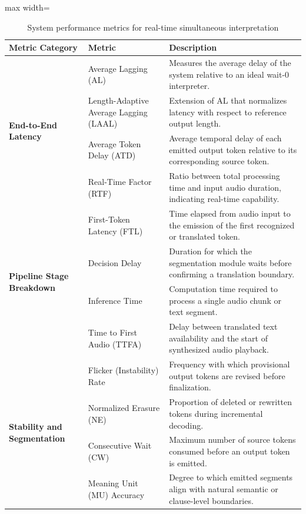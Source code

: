 \begin{table}[!htbp]
  \centering
  \caption[System performance metrics]{System performance metrics for real-time simultaneous interpretation}
  \label{tab:system_metrics}
  \small
  \begin{adjustbox}{max width=\textwidth}
    \begin{tabular}{p{4.5cm} p{4.2cm} p{7.6cm}}
      \toprule
      \textbf{Metric Category} & \textbf{Metric} & \textbf{Description} \\
      \midrule
      \multirow{4}{*}{\textbf{End-to-End Latency}}
        & Average Lagging (AL) 
        & Measures the average delay of the system relative to an ideal wait-0 interpreter. \\ \cline{2-3}
        & Length-Adaptive Average Lagging (LAAL) 
        & Extension of AL that normalizes latency with respect to reference output length. \\ \cline{2-3}
        & Average Token Delay (ATD) 
        & Average temporal delay of each emitted output token relative to its corresponding source token. \\ \cline{2-3}
        & Real-Time Factor (RTF) 
        & Ratio between total processing time and input audio duration, indicating real-time capability. \\
      \midrule
      \multirow{4}{*}{\textbf{Pipeline Stage Breakdown}}
        & First-Token Latency (FTL) 
        & Time elapsed from audio input to the emission of the first recognized or translated token. \\ \cline{2-3}
        & Decision Delay 
        & Duration for which the segmentation module waits before confirming a translation boundary. \\ \cline{2-3}
        & Inference Time 
        & Computation time required to process a single audio chunk or text segment. \\ \cline{2-3}
        & Time to First Audio (TTFA) 
        & Delay between translated text availability and the start of synthesized audio playback. \\
      \midrule
      \multirow{4}{*}{\textbf{Stability and Segmentation}}
        & Flicker (Instability) Rate 
        & Frequency with which provisional output tokens are revised before finalization. \\ \cline{2-3}
        & Normalized Erasure (NE) 
        & Proportion of deleted or rewritten tokens during incremental decoding. \\ \cline{2-3}
        & Consecutive Wait (CW) 
        & Maximum number of source tokens consumed before an output token is emitted. \\ \cline{2-3}
        & Meaning Unit (MU) Accuracy 
        & Degree to which emitted segments align with natural semantic or clause-level boundaries. \\
      \bottomrule
    \end{tabular}
  \end{adjustbox}
\end{table}


